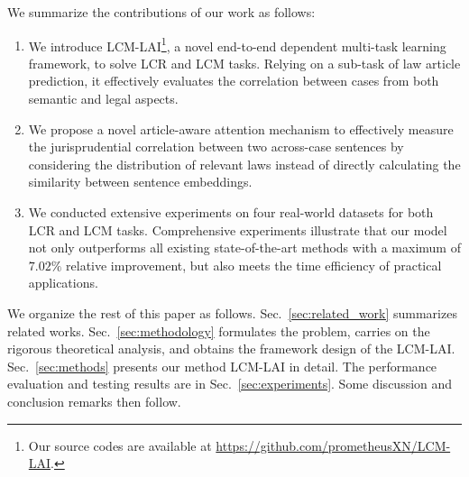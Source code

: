 We summarize the contributions of our work as follows:
\begin{enumerate}
    
    \item {We introduce LCM-LAI\footnote{Our source codes are available at \url{https://github.com/prometheusXN/LCM-LAI}.}, a novel end-to-end dependent multi-task learning framework, to solve LCR and LCM tasks. Relying on a sub-task of law article prediction, it effectively evaluates the correlation between cases from both semantic and legal aspects.}
    
    \item {We propose a novel article-aware attention mechanism to effectively measure the jurisprudential correlation between two across-case sentences by considering the distribution of relevant laws instead of directly calculating the similarity between sentence embeddings.
    }
    
    \item {We conducted extensive experiments on four real-world datasets for both LCR and LCM tasks. 
    Comprehensive experiments illustrate that our model not only outperforms all existing state-of-the-art methods with a maximum of $7.02\%$ relative improvement, but also meets the time efficiency of practical applications.}
    
\end{enumerate}

We organize the rest of this paper as follows. 
Sec.~\ref{sec:related_work} summarizes related works.
Sec.~\ref{sec:methodology} formulates the problem, carries on the rigorous theoretical analysis, and obtains the framework design of the LCM-LAI.
Sec.~\ref{sec:methods} presents our method LCM-LAI in detail.
The performance evaluation and testing results are in
Sec.~\ref{sec:experiments}.
Some discussion and conclusion remarks then follow.  